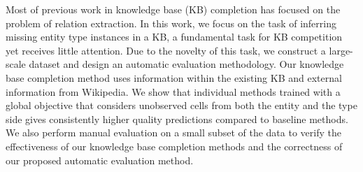 Most of previous work in knowledge base (KB) completion has focused on the problem of relation extraction. In this work, we focus on the task of inferring missing entity type instances in a KB, a fundamental task for KB competition yet receives little attention. Due to the novelty of this task, we construct a large-scale dataset and design an automatic evaluation methodology. Our knowledge base completion method uses information within the existing KB and external information from Wikipedia. We show that individual methods trained with a global objective that considers unobserved cells from both the entity and the type side gives consistently higher quality predictions compared to baseline methods. We also perform manual evaluation on a small subset of the data to verify the effectiveness of our knowledge base completion methods and the correctness of our proposed automatic evaluation method.
